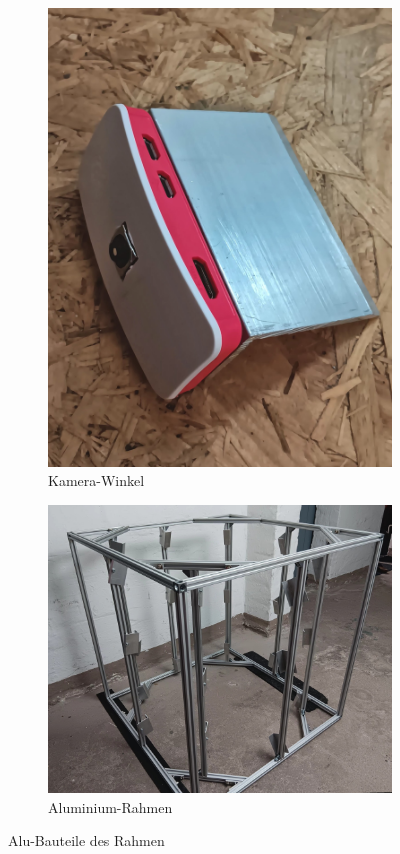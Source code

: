 \documentclass[./00PhotoBox.tex]{subfiles}
\begin{document}
\begin{figure}
    \centering
    \begin{subfigure}{0.45\textwidth}
        \includegraphics[height=0.9\linewidth]{./img/aluwinkel.jpg}
        \centering
        \caption{Kamera-Winkel} %
        \label{img:aluwinkel} %
    \end{subfigure}
    \begin{subfigure}{0.45\textwidth}
        \includegraphics[height=0.8\linewidth]{./img/alurahmen.jpg}
        \centering
        \caption{Aluminium-Rahmen} %
        \label{img:alurahmen} %
    \end{subfigure}
    \caption{Alu-Bauteile des Rahmen} %
\end{figure}
\end{document}
